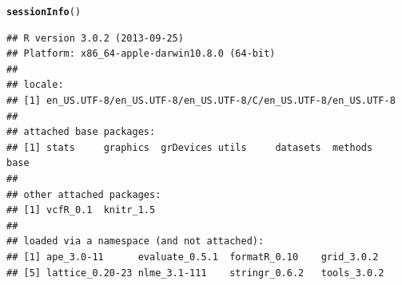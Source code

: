 \documentclass{article}\usepackage[]{graphicx}\usepackage[]{color}
\makeatletter
\newcommand{\hlstd}[1]{\textcolor[rgb]{0.345,0.345,0.345}{#1}}%
\newcommand{\hlkwd}[1]{\textcolor[rgb]{0.737,0.353,0.396}{\textbf{#1}}}%
\newenvironment{kframe}{%
 \def\at@end@of@kframe{}%
 \ifinner\ifhmode%
  \def\at@end@of@kframe{\end{minipage}}%
  \begin{minipage}{\columnwidth}%
 \fi\fi%
 \def\FrameCommand##1{\hskip\@totalleftmargin \hskip-\fboxsep
 \colorbox{shadecolor}{##1}\hskip-\fboxsep
     \hskip-\linewidth \hskip-\@totalleftmargin \hskip\columnwidth}%
 \MakeFramed {\advance\hsize-\width
   \@totalleftmargin\z@ \linewidth\hsize
   \@setminipage}}%
 {\par\unskip\endMakeFramed%
 \at@end@of@kframe}
\newenvironment{knitrout}{}{} %
\makeatother
\begin{document}
\begin{knitrout}
\color{fgcolor}\begin{kframe}
\begin{alltt}
\hlkwd{sessionInfo}\hlstd{()}
\end{alltt}
\begin{verbatim}
## R version 3.0.2 (2013-09-25)
## Platform: x86_64-apple-darwin10.8.0 (64-bit)
## 
## locale:
## [1] en_US.UTF-8/en_US.UTF-8/en_US.UTF-8/C/en_US.UTF-8/en_US.UTF-8
## 
## attached base packages:
## [1] stats     graphics  grDevices utils     datasets  methods   base     
## 
## other attached packages:
## [1] vcfR_0.1  knitr_1.5
## 
## loaded via a namespace (and not attached):
## [1] ape_3.0-11      evaluate_0.5.1  formatR_0.10    grid_3.0.2     
## [5] lattice_0.20-23 nlme_3.1-111    stringr_0.6.2   tools_3.0.2
\end{verbatim}
\end{kframe}
\end{knitrout}






\end{document}
